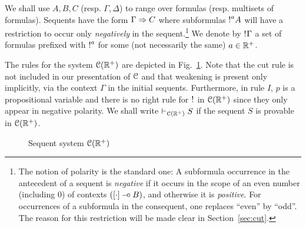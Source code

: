 We shall use $A,B,C$ (resp. $\Gamma,\Delta$) to range over formulas (resp. multisets of formulas).  
Sequents have the form $\Gamma\Rightarrow C$ where subformulas $\hbox{$\mathop{!}^{a}$}A$ will have a restriction to occur only {\em negatively} in the sequent.\footnote{The notion of polarity  is the standard one: A subformula occurrence in the antecedent of a sequent is {\em negative} if it occurs in the scope of an even number (including $0$) of contexts $([\cdot]\mathbin{-\hspace{-0.70mm}\circ} B)$, and otherwise it is {\em positive}. For occurrences of a subformula in the consequent, one replaces ``even'' by ``odd''. The reason for this restriction will be made clear in Section~\ref{sec:cut}.}
%
We denote by $\hbox{$\mathop{!}^{}$}\Gamma$ a set of formulas  prefixed with $\hbox{$\mathop{!}^{a}$}$ for some (not necessarily the same) $a\in\mathbb{R}^+$. 

The rules for the system $\mathcal{C}(\mathbb{R}^+)$ are depicted in Fig.~\ref{fig:ll}. Note that the cut rule is not included in our presentation of $\mathcal{C}$ and that weakening is present only implicitly, via the context $\Gamma$ in the initial sequents. Furthermore, in rule $I$, $p$ is a propositional variable and there is no right rule for $\hbox{$\mathop{!}^{}$}$ in $\mathcal{C}(\mathbb{R}^+)$ since they only appear in negative polarity.
We shall write $\vdash_{\mathcal{C}(\mathbb{R}^+)} S$ if the sequent $S$ is provable in $\mathcal{C}(\mathbb{R}^+)$.

\begin{figure}[t]
\caption{Sequent system $\mathcal{C}(\mathbb{R}^+)$}
\label{fig:ll}
\end{figure}

